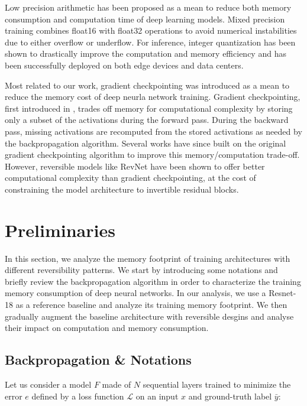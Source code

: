 \documentclass[twocolumn]{bmcart}
\begin{document}
Low precision arithmetic has been proposed as a mean to reduce both memory consumption and computation time of deep learning models. Mixed precision training \cite{} combines float16 with float32 operations to avoid numerical instabilities due to either overflow or underflow.
For inference,  integer quantization \cite{} has been shown to drastically improve the computation and memory efficiency and has been successfully deployed on both edge devices and data centers.

Most related to our work, gradient checkpointing was introduced as a mean to reduce the memory cost of deep neurla network training.
Gradient checkpointing, first introduced in \cite{}, trades off memory for computational complexity by storing only a subset of the activations during the forward pass.
During the backward pass, missing activations are recomputed from the stored activations as needed by the backpropagation algorithm.
Several works \cite{} have since built on the original gradient checkpointing algorithm to improve this memory/computation trade-off.  
However, reversible models like RevNet have been shown to offer better computational complexity than gradient checkpointing,
at the cost of constraining the model architecture to invertible residual blocks.

\section{Preliminaries}

In this section, we analyze the memory footprint of training architectures with different reversibility patterns.
We start by introducing some notations and briefly review the backpropagation algorithm
in order to characterize the training memory consumption of deep neural networks. 
In our analysis, we use a Resnet-18 as a reference baseline and analyze its training memory footprint.
We then gradually augment the baseline architecture with reversible desgins and analyse their impact on computation and memory consumption.

\subsection{Backpropagation \& Notations}

Let us consider a model $F$ made of $N$ sequential layers trained to minimize the error $e$ defined by a loss function $\mathcal{L}$ on an input $x$ and ground-truth label $\bar{y}$:
\end{document}
